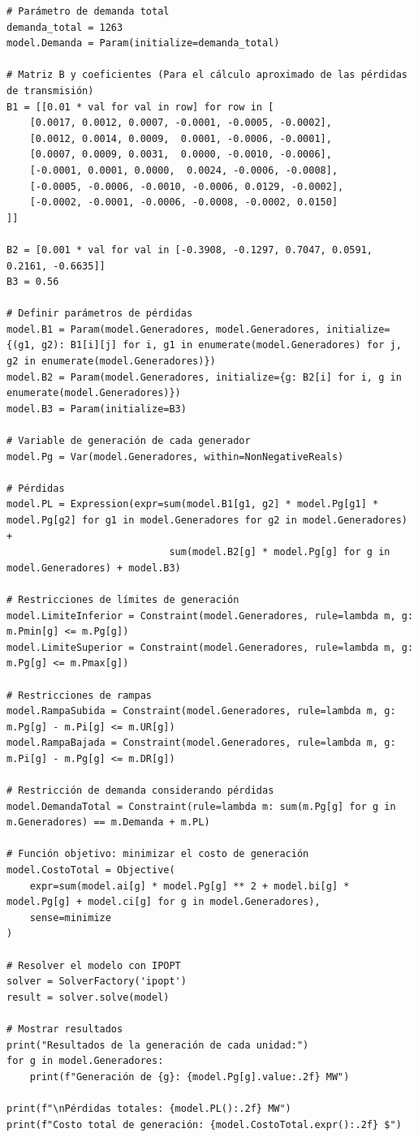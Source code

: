\documentclass[11pt]{article}
\begin{document}
\begin{lstlisting}[style=mypython, caption={Modelo de Despacho Económico con Pyomo}]
# Parámetro de demanda total
demanda_total = 1263
model.Demanda = Param(initialize=demanda_total)
    
# Matriz B y coeficientes (Para el cálculo aproximado de las pérdidas de transmisión)
B1 = [[0.01 * val for val in row] for row in [
    [0.0017, 0.0012, 0.0007, -0.0001, -0.0005, -0.0002],
    [0.0012, 0.0014, 0.0009,  0.0001, -0.0006, -0.0001],
    [0.0007, 0.0009, 0.0031,  0.0000, -0.0010, -0.0006],
    [-0.0001, 0.0001, 0.0000,  0.0024, -0.0006, -0.0008],
    [-0.0005, -0.0006, -0.0010, -0.0006, 0.0129, -0.0002],
    [-0.0002, -0.0001, -0.0006, -0.0008, -0.0002, 0.0150]
]]
    
B2 = [0.001 * val for val in [-0.3908, -0.1297, 0.7047, 0.0591, 0.2161, -0.6635]]
B3 = 0.56
    
# Definir parámetros de pérdidas
model.B1 = Param(model.Generadores, model.Generadores, initialize={(g1, g2): B1[i][j] for i, g1 in enumerate(model.Generadores) for j, g2 in enumerate(model.Generadores)})
model.B2 = Param(model.Generadores, initialize={g: B2[i] for i, g in enumerate(model.Generadores)})
model.B3 = Param(initialize=B3)
    
# Variable de generación de cada generador
model.Pg = Var(model.Generadores, within=NonNegativeReals)
    
# Pérdidas
model.PL = Expression(expr=sum(model.B1[g1, g2] * model.Pg[g1] * model.Pg[g2] for g1 in model.Generadores for g2 in model.Generadores) +
                            sum(model.B2[g] * model.Pg[g] for g in model.Generadores) + model.B3)
    
# Restricciones de límites de generación
model.LimiteInferior = Constraint(model.Generadores, rule=lambda m, g: m.Pmin[g] <= m.Pg[g])
model.LimiteSuperior = Constraint(model.Generadores, rule=lambda m, g: m.Pg[g] <= m.Pmax[g])
    
# Restricciones de rampas
model.RampaSubida = Constraint(model.Generadores, rule=lambda m, g: m.Pg[g] - m.Pi[g] <= m.UR[g])
model.RampaBajada = Constraint(model.Generadores, rule=lambda m, g: m.Pi[g] - m.Pg[g] <= m.DR[g])
    
# Restricción de demanda considerando pérdidas
model.DemandaTotal = Constraint(rule=lambda m: sum(m.Pg[g] for g in m.Generadores) == m.Demanda + m.PL)
    
# Función objetivo: minimizar el costo de generación
model.CostoTotal = Objective(
    expr=sum(model.ai[g] * model.Pg[g] ** 2 + model.bi[g] * model.Pg[g] + model.ci[g] for g in model.Generadores),
    sense=minimize
)
    
# Resolver el modelo con IPOPT
solver = SolverFactory('ipopt')
result = solver.solve(model)
    
# Mostrar resultados
print("Resultados de la generación de cada unidad:")
for g in model.Generadores:
    print(f"Generación de {g}: {model.Pg[g].value:.2f} MW")
    
print(f"\nPérdidas totales: {model.PL():.2f} MW")
print(f"Costo total de generación: {model.CostoTotal.expr():.2f} $")
\end{lstlisting}
\end{document}
